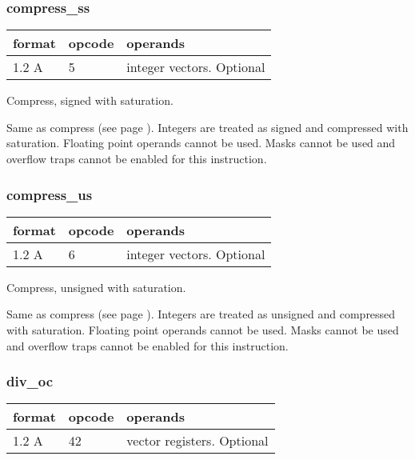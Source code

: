 \documentclass[forwardcom.tex]{subfiles}
\begin{document}
\subsubsection{compress\_ss}
\label{table:compressSsInstruction}
\begin{tabular}{|p{12mm}|p{12mm}|p{110mm}|}
\hline
\bfseries format & \bfseries opcode & \bfseries operands \\ \hline
1.2 A & 5 & integer vectors. Optional \\ \hline
\end{tabular}
\vspace{2mm}

Compress, signed with saturation.
\vspace{2mm}

Same as compress (see page \pageref{table:compressInstruction}). Integers are treated as signed and compressed with saturation. Floating point operands cannot be used. 
Masks cannot be used and overflow traps cannot be enabled for this instruction.
\vspace{2mm}

\subsubsection{compress\_us}
\label{table:compressUsInstruction}
\begin{tabular}{|p{12mm}|p{12mm}|p{110mm}|}
\hline
\bfseries format & \bfseries opcode & \bfseries operands \\ \hline
1.2 A & 6 & integer vectors. Optional \\ \hline
\end{tabular}
\vspace{2mm}

Compress, unsigned with saturation.
\vspace{2mm}

Same as compress (see page \pageref{table:compressInstruction}). Integers are treated as unsigned and compressed with saturation. Floating point operands cannot be used.
Masks cannot be used and overflow traps cannot be enabled for this instruction.
\vspace{2mm}


\subsubsection{div\_oc}
\label{table:divOcInstruction}
\begin{tabular}{|p{12mm}|p{12mm}|p{110mm}|}
\hline
\bfseries format & \bfseries opcode & \bfseries operands \\ \hline
1.2 A & 42 & vector registers. Optional \\ \hline
\end{tabular}
\vspace{2mm}
\end{document}

